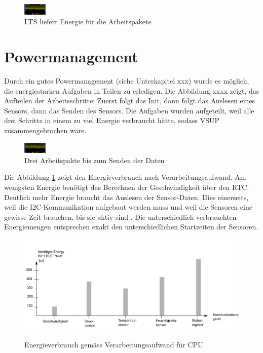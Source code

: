 \begin{figure}[ht]
    \includegraphics[width=0.1\textwidth]{4Resultate/imag/SpannungVCC.png} 
    \caption{LTS liefert Energie für die Arbeitspakete}
\end{figure}


\section{Powermanagement}

Durch ein gutes Powermanagement (siehe Unterkapitel xxx) wurde es möglich, die energiestarken Aufgaben in Teilen zu erledigen. Die Abbildung xxxx zeigt, das Aufteilen der Arbeitsschritte: Zuerst folgt das Init, dann folgt das Auslesen eines Sensors, dann das Senden des Sensors. Die Aufgaben wurden aufgeteilt, weil alle drei Schritte in einem zu viel Energie verbraucht hätte, sodass VSUP zusammengebrochen wäre.

\begin{figure}[ht]
\includegraphics[width=0.1\textwidth]{4Resultate/imag/SpannungVCC.png} 
\caption{Drei Arbeitspakte bis zum Senden der Daten }
\end{figure}


Die Abbildung \ref{resultat_E_Verbrauch_Verarbeitungsaufwand} zeigt den Energieverbrauch nach Verarbeitungsaufwand. Am wenigsten Energie benötigt das Berechnen der Geschwindigkeit über den RTC. Deutlich mehr Energie braucht das Auslesen der Sensor-Daten. Dies einerseits, weil die I2C-Kommunikation aufgebaut werden muss und weil die Sensoren eine gewisse Zeit brauchen, bis sie aktiv sind . Die unterschiedlich verbrauchten Energiemengen entsprechen exakt den unterschiedlichen Startzeiten der Sensoren. 

\begin{figure}[ht]
\includegraphics[width=1\textwidth]{4Resultate/imag/EnergyVerbrauchNachKommunikation.png} \label{resultat_E_Verbrauch_Verarbeitungsaufwand} 
\caption{Energieverbrauch gemäss Verarbeitungsaufwand für CPU}
\end{figure}

